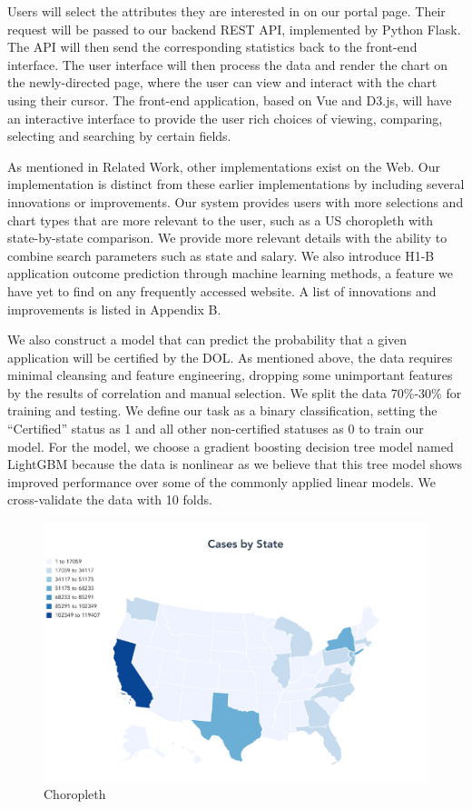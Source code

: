 \documentclass[sigconf]{acmart}
\begin{document}
Users will select the attributes they are interested in on our portal page. Their request will be passed to our 
backend REST API, implemented by Python Flask. The API will then send the corresponding statistics back to the 
front-end interface. The user interface will then process the data and render the chart on the newly-directed page, 
where the user can view and interact with the chart using their cursor. The front-end application, based on Vue and D3.js, 
will have an interactive interface to provide the user rich choices of viewing, comparing, selecting and searching by certain fields. 



As mentioned in Related Work, other implementations exist on the Web. Our implementation is distinct from these earlier 
implementations by including several innovations or improvements. Our system provides users with more selections and 
chart types that are more relevant to the user, such as a US choropleth with state-by-state comparison. 
We provide more relevant details with the ability to combine search parameters such as state and salary. 
We also introduce H1-B application outcome prediction through machine learning methods, a feature we have yet to find on 
any frequently accessed website. A list of innovations and improvements is listed in Appendix B.  


We also construct a model that can predict the probability that a given application will be certified by the DOL. 
As mentioned above, the data requires minimal cleansing and feature engineering, dropping some unimportant features 
by the results of correlation and manual selection. We split the data 70\%-30\% for training and testing. 
We define our task as a binary classification, setting the “Certified” status as 1 and all other non-certified statuses 
as 0 to train our model. For the model, we choose a gradient boosting decision tree model named LightGBM because the data 
is nonlinear as we believe that this tree model shows improved performance over some of the commonly applied linear models. 
We cross-validate the data with 10 folds. 



\begin{figure}
  \includegraphics[width=\linewidth]{fig1.png}
  \caption{Choropleth}
  \label{fig:choropleth}
\end{figure}
\end{document}
